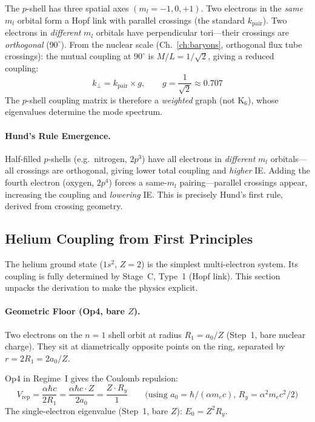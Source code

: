 The $p$-shell has three spatial axes $(m_l = -1, 0, +1)$.
Two electrons in the \emph{same} $m_l$ orbital form a Hopf link
with parallel crossings (the standard $k_{\text{pair}}$).
Two electrons in \emph{different} $m_l$ orbitals have perpendicular
tori---their crossings are \emph{orthogonal} ($90^\circ$).
From the nuclear scale (Ch.~\ref{ch:baryons}, orthogonal flux tube
crossings): the mutual coupling at $90^\circ$ is $M/L = 1/\sqrt{2}$,
giving a reduced coupling:
\begin{equation}
    k_{\perp} = k_{\text{pair}} \times g, \qquad
    g = \frac{1}{\sqrt{2}} \approx 0.707
    \label{eq:k_perp}
\end{equation}
The $p$-shell coupling matrix is therefore a \emph{weighted} graph
(not $\mathrm{K}_6$), whose eigenvalues determine the mode spectrum.

\paragraph{Hund's Rule Emergence.}
Half-filled $p$-shells (e.g.\ nitrogen, $2p^3$) have all electrons
in \emph{different} $m_l$ orbitals---all crossings are orthogonal,
giving lower total coupling and \emph{higher} IE. Adding the fourth
electron (oxygen, $2p^4$) forces a same-$m_l$ pairing---parallel
crossings appear, increasing the coupling and \emph{lowering} IE.
This is precisely Hund's first rule, derived from crossing geometry.

\subsection{Helium Coupling from First Principles}
\label{sec:lattice_js2}

The helium ground state ($1s^2$, $Z = 2$) is the simplest
multi-electron system.  Its coupling is fully determined by
Stage~C, Type~1 (Hopf link).  This section unpacks the
derivation to make the physics explicit.

\paragraph{Geometric Floor (Op4, bare $Z$).}
Two electrons on the $n = 1$ shell orbit at radius
$R_1 = a_0 / Z$ (Step~1, bare nuclear charge).
They sit at diametrically opposite points on the ring,
separated by $r = 2R_1 = 2a_0/Z$.

Op4 in Regime~I gives the Coulomb repulsion:
\begin{equation}
    V_{\text{rep}} = \frac{\alpha\hbar c}{2R_1}
    = \frac{\alpha\hbar c \cdot Z}{2 a_0}
    = \frac{Z \cdot R_y}{1}
    \qquad\text{(using $a_0 = \hbar/(\alpha m_e c)$,
    $R_y = \alpha^2 m_e c^2/2$)}
\end{equation}
The single-electron eigenvalue (Step~1, bare $Z$):
$E_0 = Z^2 R_y$.

